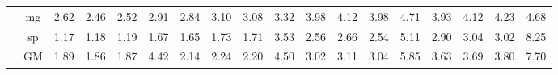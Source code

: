 \begin{table}[]
\begin{center}
{\begin{tabular}{|c|c|rrrr|rrrr|rrrr|rrrr|}
 &  mg  &  2.62  & \cellcolor{blue!25} 2.46  &  2.52  &   2.91  &  2.84  &  3.10  & \cellcolor{blue!25} 3.08  &   3.32  &  3.98  &  4.12  & \cellcolor{blue!25} 3.98  &  4.71  &  3.93  &  4.12  &  4.23  &   4.68 \\
 &  sp  &  1.17  &  1.18  &  1.19  &   1.67  &  1.65  &  1.73  & \cellcolor{blue!25} 1.71  &   3.53  &  2.56  &  2.66  & \cellcolor{blue!25} 2.54  &  5.11  &  2.90  &  3.04  & \cellcolor{blue!25} 3.02  &   8.25 \\
 &  GM  &  1.89  & \cellcolor{blue!25} 1.86  &  1.87  &   4.42  &  2.14  &  2.24  & \cellcolor{blue!25} 2.20  &   4.50  &  3.02  &  3.11  & \cellcolor{blue!25} 3.04  &  5.85  &  3.63  &  3.69  &  3.80  &   7.70 \\
\hline
\end{tabular} }

\end{center}
\end{table}
